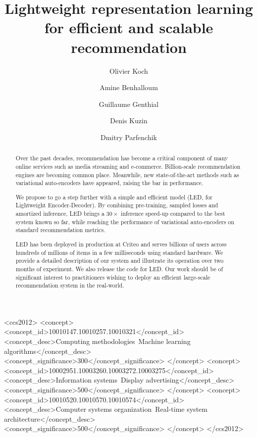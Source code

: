 \documentclass[sigconf]{acmart}
\begin{document}
\title{Lightweight representation learning for efficient and scalable recommendation}



\author{Olivier Koch}

\author{Amine Benhalloum}

\author{Guillaume Genthial}

\author{Denis Kuzin}
  
\author{Dmitry Parfenchik}

\renewcommand{\shortauthors}{}

\begin{abstract}

Over the past decades, recommendation has become a critical component of many online services such as media streaming and e-commerce. Billion-scale recommendation engines are becoming common place. Meanwhile, new state-of-the-art methods such as variational auto-encoders have appeared, raising the bar in performance. 


We propose to go a step further with a simple and efficient model (LED, for Lightweight Encoder-Decoder). By combining pre-training, sampled losses and amortized inference, LED brings a $30\times$ inference speed-up compared to the best system known so far, while reaching the performance of variational auto-encoders on standard recommendation metrics.

LED has been deployed in production at Criteo and serves billions of users across hundreds of millions of items in a few milliseconds using standard hardware. We provide a detailed description of our system and illustrate its operation over two months of experiment. We also release the code for LED. Our work should be of significant interest to practitioners wishing to deploy an efficient large-scale recommendation system in the real-world.
\end{abstract}

\begin{CCSXML}
<ccs2012>
<concept>
<concept_id>10010147.10010257.10010321</concept_id>
<concept_desc>Computing methodologies~Machine learning algorithms</concept_desc>
<concept_significance>300</concept_significance>
</concept>
<concept>
<concept_id>10002951.10003260.10003272.10003275</concept_id>
<concept_desc>Information systems~Display advertising</concept_desc>
<concept_significance>500</concept_significance>
</concept>
<concept>
<concept_id>10010520.10010570.10010574</concept_id>
<concept_desc>Computer systems organization~Real-time system architecture</concept_desc>
<concept_significance>500</concept_significance>
</concept>
</ccs2012>
\end{CCSXML}
\end{document}
